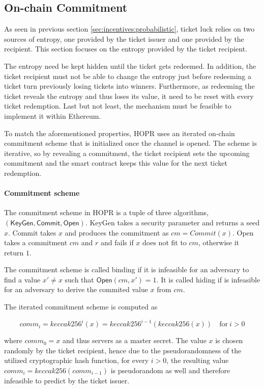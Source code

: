\subsection{On-chain Commitment}
\label{sec:incentives:commitment}

As seen in previous section \ref{sec:incentives:probabilistic}, ticket luck relies on two sources of entropy, one provided by the ticket issuer and one provided by the recipient. This section focuses on the entropy provided by the ticket recipient.

The entropy need be kept hidden until the ticket gets redeemed. In addition, the ticket recipient must not be able to change the entropy just before redeeming a ticket turn previously losing tickets into winners. Furthermore, as redeeming the ticket reveals the entropy and thus loses its value, it need to be reset with every ticket redemption. Last but not least, the mechanism must be feasible to implement it within Ethereum.

To match the aforementioned properties, HOPR uses an iterated on-chain commitment scheme that is initialized once the channel is opened. The scheme is iterative, so by revealing a commitment, the ticket recipient sets the upcoming commitment and the smart contract keeps this value for the next ticket redemption.

\paragraph{Commitment scheme}
\label{sec:incentives:commitment:scheme}

The commitment scheme in HOPR is a tuple of three algorithms, $(\mathsf{KeyGen}, \mathsf{Commit}, \mathsf{Open})$. \textsf{KeyGen} takes a security parameter and returns a seed $x$. \textsf{Commit} takes $x$ and produces the commitment as $ cm = Commit(x) $. \textsf{Open} takes a commitment $cm$ and $r$ and fails if $x$ does not fit to $cm$, otherwise it return $1$.

The commitment scheme is called binding if it is infeasible for an adversary to find a value $x' \ne x$ such that $\mathsf{Open}(cm, x') = 1$. It is called hiding if is infeasible for an adversary to derive the commited value $x$ from $cm$.

The iterated commitment scheme is computed as

$$ comm_i = keccak256 ^i (x) = keccak256 ^{i-1} (keccak256 (x)) \quad \text{for} \ i > 0$$

where $comm_0 = x$ and thus servers as a master secret. The value $x$ is chosen randomly by the ticket recipient, hence due to the pseudorandomness of the utilized cryptographic hash function, for every $i > 0$, the resulting value $comm_i = keccak256(comm_{i-1})$ is pseudorandom as well and therefore infeasible to predict by the ticket issuer.

